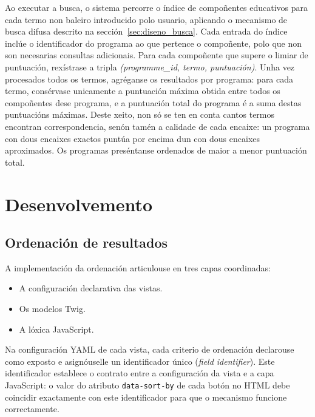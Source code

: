 \documentclass[%
    a4paper,               %
    twoside,               %
    10pt,                  %
]{article}                 %
\begin{document}
Ao executar a busca, o sistema percorre o índice de compoñentes educativos para cada termo non baleiro introducido polo usuario, aplicando o mecanismo de busca difusa descrito na sección~\ref{sec:diseno_busca}. Cada entrada do índice inclúe o identificador do programa ao que pertence o compoñente, polo que non son necesarias consultas adicionais. Para cada compoñente que supere o limiar de puntuación, rexístrase a tripla \textit{(programme\_id, termo, puntuación)}. Unha vez procesados todos os termos, agréganse os resultados por programa: para cada termo, consérvase unicamente a puntuación máxima obtida entre todos os compoñentes dese programa, e a puntuación total do programa é a suma destas puntuacións máximas. Deste xeito, non só se ten en conta cantos termos encontran correspondencia, senón tamén a calidade de cada encaixe: un programa con dous encaixes exactos puntúa por encima dun con dous encaixes aproximados. Os programas preséntanse ordenados de maior a menor puntuación total.

\section{Desenvolvemento}

\subsection{Ordenación de resultados}

A implementación da ordenación articulouse en tres capas coordinadas:
\begin{itemize}
    \item A configuración declarativa das vistas.
    \item Os modelos Twig.
    \item A lóxica JavaScript.
\end{itemize}

Na configuración YAML de cada vista, cada criterio de ordenación declarouse como exposto e asignóuselle un identificador único (\textit{field identifier}). Este identificador establece o contrato entre a configuración da vista e a capa JavaScript: o valor do atributo \texttt{data-sort-by} de cada botón no HTML debe coincidir exactamente con este identificador para que o mecanismo funcione correctamente.
\end{document}
